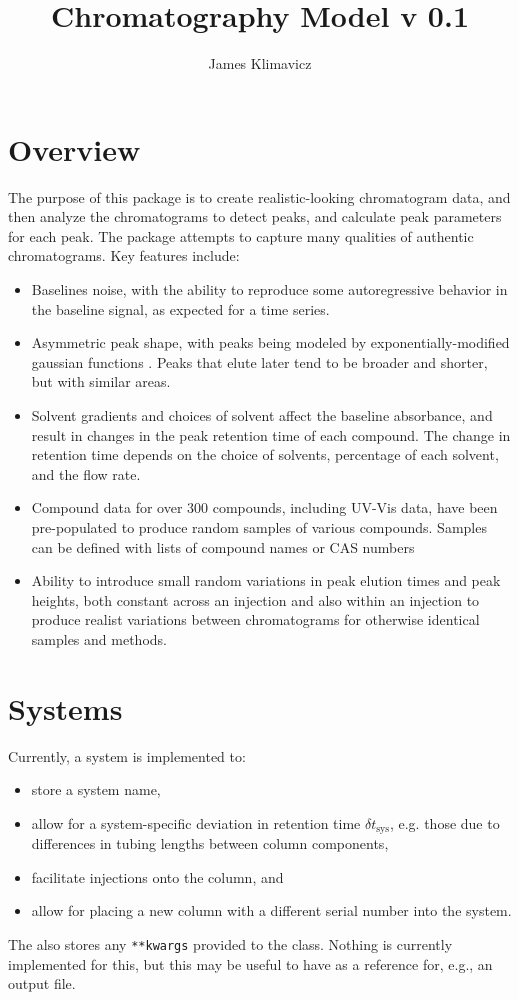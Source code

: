 \documentclass{article}
\title{Chromatography Model v 0.1}
\author{James Klimavicz}
\newcommand{\cbtt}[1]{\textcolor{codepurple}{\fontseries{b}\selectfont{\texttt{#1}}}}
\begin{document}
\maketitle
\section*{Overview}
The purpose of this package is to create realistic-looking chromatogram data, and then analyze the chromatograms to detect peaks, and calculate peak parameters for each peak. The package attempts to capture many qualities of authentic chromatograms. Key features include:

\begin{itemize}
\item Baselines noise, with the ability to reproduce some autoregressive behavior in the baseline signal, as expected for a time series.
\item Asymmetric peak shape, with peaks being modeled by exponentially-modified gaussian functions \cite{emg2}. Peaks that elute later tend to be broader and shorter, but with similar areas.
\item Solvent gradients and choices of solvent affect the baseline absorbance, and result in changes in the peak retention time of each compound. The change in retention time depends on the choice of solvents, percentage of each solvent, and the flow rate. 
\item Compound data for over 300 compounds, including UV-Vis data, have been pre-populated to produce random samples of various compounds. Samples can be defined with lists of compound names or CAS numbers
\item Ability to introduce small random variations in peak elution times and peak heights, both constant across an injection and also within an injection to produce realist variations between chromatograms for otherwise identical samples and methods.
\end{itemize}

\tableofcontents


\section{Systems}\label{sec:sys}
Currently, a system is implemented to:
\begin{itemize}
\item store a system name,
\item allow for a system-specific deviation in retention time $\delta t_{\text{sys}}$, e.g. those due to differences in tubing lengths between column components, 
\item facilitate injections onto the column, and
\item allow for placing a new column with a different serial number into the system. 
\end{itemize}
The \cbtt{System} also stores any \texttt{**kwargs} provided to the class. Nothing is currently implemented for this, but this may be useful to have as a reference for, e.g., an output file.
\end{document}
